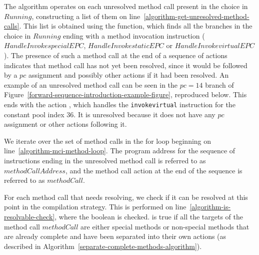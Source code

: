 The algorithm operates on each unresolved method call present in the
choice in $Running$, constructing a list of them on
line~\ref{algorithm-get-unresolved-method-calls}.
This list is obtained using the 
function, which finds all the branches in the choice in $Running$
ending with a method invocation instruction ($HandleInvokespecialEPC$,
$HandleInvokestaticEPC$ or $HandleInvokevirtualEPC$).
The presence of such a method call at the end of a sequence of actions
indicates that method call has not yet been resolved, since it would
be followed by a $pc$ assignment and possibly other actions if it had
been resolved.
An example of an unresolved method call can be seen in the $pc = 14$
branch of Figure~\ref{forward-sequence-introduction-example-figure},
reproduced below.
%
This ends with the action ,
which handles the \texttt{invokevirtual} instruction for the constant
pool index $36$.
It is unresolved because it does not have any $pc$ assignment or other
actions following it.

We iterate over the set of method calls in the for loop beginning on
line~\ref{algorithm-mci-method-loop}.
The program address for the sequence of instructions ending in the
unresolved method call is referred to as $methodCallAddress$, and the
method call action at the end of the sequence is referred to as
$methodCall$.

For each method call that needs resolving, we check if it can be
resolved at this point in the compilation strategy.
This is performed on line~\ref{algorithm-is-resolvable-check}, where
the boolean  is checked.
 is true if all the targets of the
method call $methodCall$ are either special methods or non-special
methods that are already complete and have been separated into their
own actions (as described in
Algorithm~\ref{separate-complete-methods-algorithm}).


